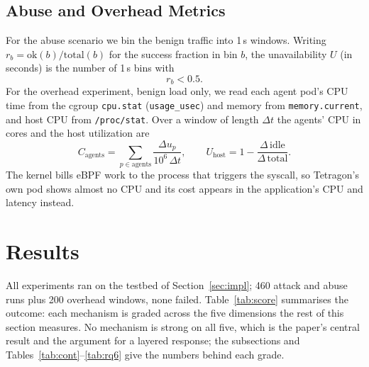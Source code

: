 \documentclass[10pt,conference]{IEEEtran}
\begin{document}
\subsection{Abuse and Overhead Metrics}
For the abuse scenario we bin the benign traffic into 1\,s windows. Writing $r_b=\text{ok}(b)/\text{total}(b)$ for the success fraction in bin $b$, the unavailability $U$ (in seconds) is the number of 1\,s bins with
\begin{equation}
r_b < 0.5 .
\end{equation}
For the overhead experiment, benign load only, we read each agent pod's CPU time from the cgroup \texttt{cpu.stat} (\texttt{usage\_usec}) and memory from \texttt{memory.current}, and host CPU from \texttt{/proc/stat}. Over a window of length $\Delta t$ the agents' CPU in cores and the host utilization are
\begin{equation}
C_\text{agents}=\sum_{p\in\text{agents}}\frac{\Delta u_p}{10^{6}\,\Delta t},\qquad
U_\text{host}=1-\frac{\Delta\,\text{idle}}{\Delta\,\text{total}} .
\end{equation}
The kernel bills eBPF work to the process that triggers the syscall, so Tetragon's own pod shows almost no CPU and its cost appears in the application's CPU and latency instead.

\section{Results}\label{sec:results}
All experiments ran on the testbed of Section~\ref{sec:impl}; 460 attack and abuse runs plus 200 overhead windows, none failed. Table~\ref{tab:score} summarises the outcome: each mechanism is graded across the five dimensions the rest of this section measures. No mechanism is strong on all five, which is the paper's central result and the argument for a layered response; the subsections and Tables~\ref{tab:cont}--\ref{tab:rq6} give the numbers behind each grade.
\end{document}

